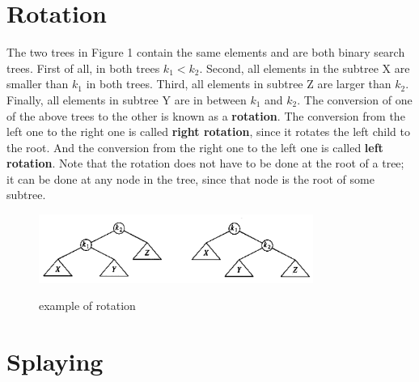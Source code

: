 \documentclass[a4paper,11pt]{article}
\begin{document}
\section*{Rotation}
The two trees in Figure 1 contain the same elements and are both binary search trees. First of all, in both trees $k_1 < k_2$. Second, all elements in the subtree X are smaller than $k_1$ in both trees. Third, all elements in subtree Z are larger than $k_2$. Finally, all elements in subtree Y are in between $k_1$ and $k_2$. The conversion of one of the above trees to the other is known as a \textbf{rotation}. The conversion from the left one to the right one is called \textbf{right rotation}, since it rotates the left child to the root. And the conversion from the right one to the left one is called \textbf{left rotation}. Note that the rotation does not have to be done at the root of a tree; it can be done at any node in the tree, since that node is the root of some subtree.
\begin{figure}
  \centering
  \includegraphics[width=0.8\textwidth]{rotation_example}\\
  \caption{example of rotation}%
\end{figure}
\section{Splaying}
\end{document}
